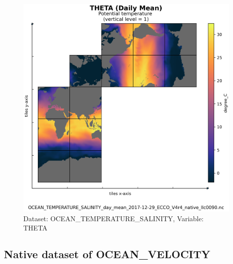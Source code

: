 \begin{figure}[H]
\centering
\includegraphics[scale=0.55]{../images/plots/native_plots/Ocean_Temperature_and_Salinity/THETA.png}
\caption{Dataset: OCEAN\_TEMPERATURE\_SALINITY, Variable: THETA}
\label{tab:table-OCEAN_TEMPERATURE_SALINITY_THETA-Plot}
\end{figure}
\newpage
\subsection{Native dataset of OCEAN\_VELOCITY}
\newp
